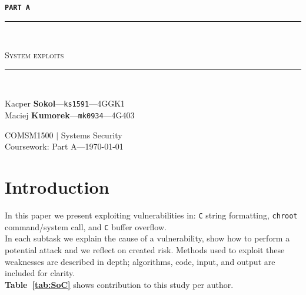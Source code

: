 \documentclass[12pt, a4paper, pdflatex]{article}
\newcommand{\HRule}{\rule{\linewidth}{0.5mm}}
\begin{document}

\begin{center}
\vspace*{\fill}
  \Huge
 \texttt{\textbf{PART A}}

\end{center}


\begin{center}
    \begin{large}
    {\HRule \\[0.2cm]}
    \textsc{System exploits}
    {\HRule \\[0.3cm]}
    \end{large}

    \begin{minipage}{ 0.49\textwidth }
        \begin{flushleft}
            Kacper \textbf{Sokol}---\texttt{ks1591}---4GGK1\\
            Maciej \textbf{Kumorek}---\texttt{mk0934}---4G403\\
        \end{flushleft}
    \end{minipage}
    \begin{minipage}{ 0.49\textwidth }
        \begin{flushright}
            {COMSM1500 $|$ Systems Security\\
            Coursework: Part A---\today\\[0.3cm]}
        \end{flushright}
    \end{minipage}
\end{center}
\vspace*{\fill}

\newpage

\section{Introduction}
In this paper we present exploiting vulnerabilities in: \texttt{C} string formatting, \texttt{chroot} command/system call, and \texttt{C} buffer overflow.\\
In each subtask we explain the cause of a vulnerability, show how to perform a potential attack and we reflect on created risk. Methods used to exploit these weaknesses are described in depth; algorithms, code, input, and output are included for clarity.\\
\textbf{Table~\ref{tab:SoC}} shows contribution to this study per author.
\end{document}

